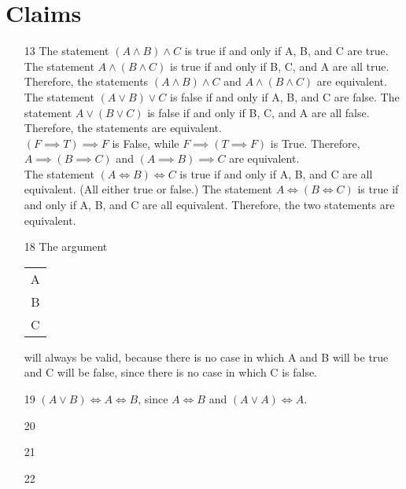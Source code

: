 \documentclass{article}
\begin{document}
	\section{Claims}
	\begin{enumerate}
		\item[13]
			The statement $(A \land B) \land C$ is true if and only if A, B, and C are true. The statement $A \land (B \land C)$ is true if and only if B, C, and A are all true. Therefore, the statements $(A \land B) \land C$ and $A \land (B \land C)$ are equivalent.\\
			The statement $(A \lor B) \lor C$ is false if and only if A, B, and C are false. The statement $A \lor (B \lor C)$ is false if and only if B, C, and A are all false. Therefore, the statements are equivalent. \\
			$(F \implies T) \implies F$ is False, while $F \implies (T \implies F)$ is True. Therefore, $A \implies (B \implies C)$ and $(A \implies B) \implies C$ are equivalent.\\
			The statement $(A \iff B) \iff C$ is true if and only if A, B, and C are all equivalent. (All either true or false.) The statement $A \iff (B \iff C)$ is true if and only if A, B, and C are all equivalent. Therefore, the two statements are equivalent. \\
		\item[18]
			The argument \begin{tabular}{c}A\\B\\\hline C\end{tabular} will always be valid, because there is no case in which A and B will be true and C will be false, since there is no case in which C is false. \\
		\item[19]
			$(A \lor B)\iff A \iff B$, since $A \iff B$ and $(A \lor A) \iff A$. \\
		\item[20]
			
		\item[21]

		\item[22]
	\end{enumerate}
\end{document}
